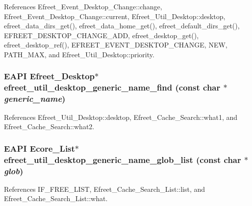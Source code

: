 References Efreet\_\-Event\_\-Desktop\_\-Change::change, Efreet\_\-Event\_\-Desktop\_\-Change::current, Efreet\_\-Util\_\-Desktop::desktop, efreet\_\-data\_\-dirs\_\-get(), efreet\_\-data\_\-home\_\-get(), efreet\_\-default\_\-dirs\_\-get(), EFREET\_\-DESKTOP\_\-CHANGE\_\-ADD, efreet\_\-desktop\_\-get(), efreet\_\-desktop\_\-ref(), EFREET\_\-EVENT\_\-DESKTOP\_\-CHANGE, NEW, PATH\_\-MAX, and Efreet\_\-Util\_\-Desktop::priority.
\subsubsection[efreet\_\-util\_\-desktop\_\-generic\_\-name\_\-find]{\setlength{\rightskip}{0pt plus 5cm}EAPI {\bf Efreet\_\-Desktop}$\ast$ efreet\_\-util\_\-desktop\_\-generic\_\-name\_\-find (const char $\ast$ {\em generic\_\-name})}\label{efreet__utils_8c_3600f55c83919cf98aeb48dea4c3c571}




References Efreet\_\-Util\_\-Desktop::desktop, Efreet\_\-Cache\_\-Search::what1, and Efreet\_\-Cache\_\-Search::what2.
\subsubsection[efreet\_\-util\_\-desktop\_\-generic\_\-name\_\-glob\_\-list]{\setlength{\rightskip}{0pt plus 5cm}EAPI Ecore\_\-List$\ast$ efreet\_\-util\_\-desktop\_\-generic\_\-name\_\-glob\_\-list (const char $\ast$ {\em glob})}\label{efreet__utils_8c_212202181fd841447e81a6ba4fbd567d}




References IF\_\-FREE\_\-LIST, Efreet\_\-Cache\_\-Search\_\-List::list, and Efreet\_\-Cache\_\-Search\_\-List::what.
